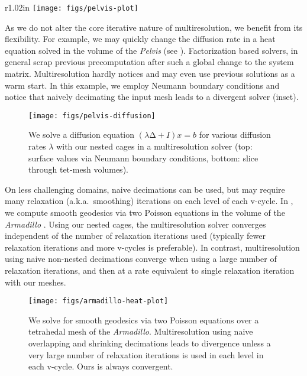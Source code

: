 \begin{wrapfigure}{r}{1.02in}
%
\centering
%
\texttt{[image: figs/pelvis-plot]}
%
\end{wrapfigure}
%
As we do not alter the core iterative nature of multiresolution, we benefit
from its flexibility. For example, we may quickly change the diffusion rate in
a heat equation solved in the volume of the \emph{Pelvis} (see
). 
%
Factorization based solvers, in general scrap previous precomputation after
such a global change to the system matrix. 
%
Multiresolution hardly notices and may even use previous solutions as a warm
start.
%
In this example, we employ Neumann boundary conditions and notice that naively
decimating the input mesh leads to a divergent solver (inset).

\begin{figure}
  \texttt{[image: figs/pelvis-diffusion]}
  \caption{We solve a diffusion equation $(λ∆+I) x = b$ for various diffusion
  rates $λ$ with our nested cages in a multiresolution solver (top: surface
  values via Neumann boundary conditions, bottom: slice through tet-mesh
  volumes).}
  \label{fig:pelvis-diffusion}
\end{figure}

On less challenging domains, naive decimations can be used, but may require
many relaxation (a.k.a.\ smoothing) iterations on each level of each v-cycle.
%
In , we compute smooth geodesics via two Poisson
equations in the volume of the \emph{Armadillo} \cite{Crane:2013:RFV}.
%
Using our nested cages, the multiresolution solver converges independent of the
number of relaxation iterations used (typically fewer relaxation iterations and
more v-cycles is preferable).
%
In contrast, multiresolution using naive non-nested decimations converge when
using a large number of relaxation iterations, and then at a rate equivalent to
single relaxation iteration with our meshes.

\begin{figure}
  \texttt{[image: figs/armadillo-heat-plot]}
  \caption{We solve for smooth geodesics via two Poisson equations over a
  tetrahedal mesh of the \emph{Armadillo}. Multiresolution using naive
  overlapping and shrinking decimations leads to divergence unless a very large
  number of relaxation iterations is used in each level in each v-cycle. Ours
  is always convergent.}
  \label{fig:armadillo-heat-plot}
\end{figure}

